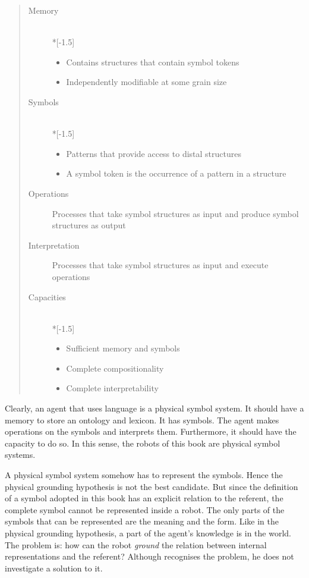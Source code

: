 \begin{quote}
\begin{description}
\item[Memory]\mbox{}\\*[-1.5\baselineskip]
\begin{itemize}
	\item Contains structures that contain symbol tokens
	\item Independently modifiable at some grain size
\end{itemize}
\item[Symbols]\mbox{}\\*[-1.5\baselineskip]
\begin{itemize}
\item Patterns that provide access to distal structures
\item A symbol token is the occurrence of a pattern in a structure
\end{itemize}

\item[Operations]
Processes that take symbol structures as input and produce symbol structures as output

\item[Interpretation] Processes that take symbol structures as input and execute operations

\item[Capacities]\mbox{}\\*[-1.5\baselineskip]\begin{itemize}
\item Sufficient memory and symbols
\item Complete compositionality
\item Complete interpretability
\end{itemize}
\end{description}
\end{quote}


Clearly, an agent that uses language is a physical symbol system. It should have a memory to store an ontology and lexicon. It has symbols. The agent makes operations on the symbols and interprets them. Furthermore, it should have the capacity to do so. In this sense, the robots of this book are physical symbol systems.

A physical symbol system somehow has to represent the symbols. Hence the physical grounding hypothesis is not the best candidate. But since the definition of a symbol adopted in this book has an explicit relation to the referent, the complete symbol cannot be represented inside a robot. The only parts of the symbols that can be represented are the meaning and the form. Like in the physical grounding hypothesis, a part of the agent's knowledge is in the world. The problem is: how can the robot {\em ground} the relation between internal representations and the referent? Although \citet{newell:1990} recognises the problem, he does not investigate a solution to it.

